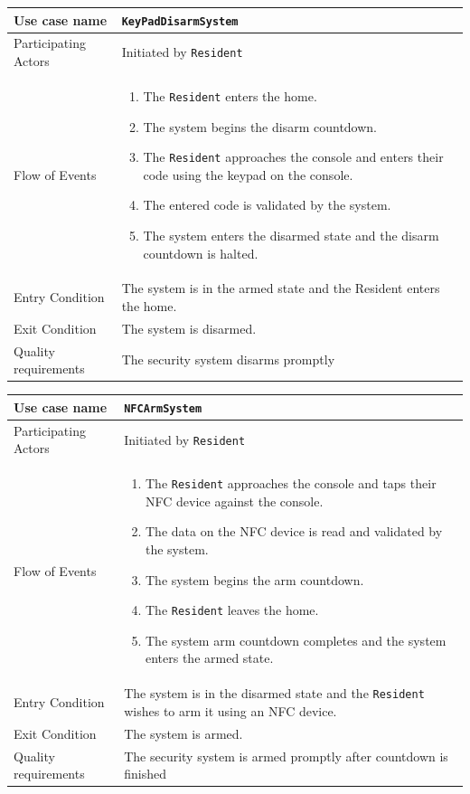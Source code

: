 \documentclass{report}
\begin{document}
\begin{tabular}{| l | p{12cm} |}
\hline
Use case name & \texttt{KeyPadDisarmSystem} \\ \hline
Participating Actors & Initiated by \texttt{Resident} \\ \hline
Flow of Events & 

\begin{enumerate}
 \item The \texttt{Resident} enters the home.
 \item The system begins the disarm countdown.
 \item The \texttt{Resident} approaches the console and enters their code using
       the keypad on the console.
 \item The entered code is validated by the system.
 \item The system enters the disarmed state and the disarm countdown is halted.
\end{enumerate}

\\ \hline

Entry Condition & The system is in the armed state and the Resident
enters the home. \\ \hline

Exit Condition & The system is disarmed. \\ \hline
Quality requirements & The security system disarms promptly \\ \hline

\hline
\end{tabular}

\begin{tabular}{| l | p{12cm} |}
\hline
Use case name & \texttt{NFCArmSystem} \\ \hline
Participating Actors & Initiated by \texttt{Resident} \\ \hline
Flow of Events & 

\begin{enumerate}
 \item The \texttt{Resident} approaches the console and taps their NFC device
       against the console.
 \item The data on the NFC device is read and validated by the system.
 \item The system begins the arm countdown.
 \item The \texttt{Resident} leaves the home.
 \item The system arm countdown completes and the system enters the armed state.
\end{enumerate}

\\ \hline

Entry Condition & The system is in the disarmed state and the \texttt{Resident}
wishes to arm it using an NFC device. \\ \hline

Exit Condition & The system is armed. \\ \hline
Quality requirements & The security system is armed promptly after countdown is
finished\\ \hline

\hline
\end{tabular}
\end{document}
